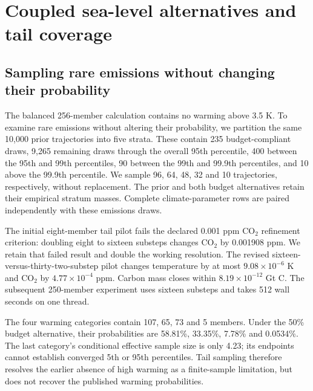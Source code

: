 \section{Coupled sea-level alternatives and tail coverage}
\subsection{Sampling rare emissions without changing their probability}
The balanced 256-member calculation contains no warming above 3.5 K. To examine
rare emissions without altering their probability, we partition the same
10,000 prior trajectories into five strata. These contain 235 budget-compliant
draws, 9,265 remaining draws through the overall 95th percentile, 400 between
the 95th and 99th percentiles, 90 between the 99th and 99.9th percentiles, and
10 above the 99.9th percentile. We sample 96, 64, 48, 32 and 10 trajectories,
respectively, without replacement. The prior and both budget alternatives
retain their empirical stratum masses. Complete climate-parameter rows are
paired independently with these emissions draws.

The initial eight-member tail pilot fails the declared 0.001 ppm CO$_2$
refinement criterion: doubling eight to sixteen substeps changes CO$_2$ by
0.001908 ppm. We retain that failed result and double the working resolution.
The revised sixteen-versus-thirty-two-substep pilot changes temperature by at
most $9.08\times10^{-6}$ K and CO$_2$ by $4.77\times10^{-4}$ ppm. Carbon mass
closes within $8.19\times10^{-12}$ Gt C. The subsequent 250-member experiment
uses sixteen substeps and takes 512 wall seconds on one thread.

The four warming categories contain 107, 65, 73 and 5 members. Under the 50\%
budget alternative, their probabilities are 58.81\%, 33.35\%, 7.78\% and
0.0534\%. The last category's conditional effective sample size is only 4.23;
its endpoints cannot establish converged 5th or 95th percentiles. Tail sampling
therefore resolves the earlier absence of high warming as a finite-sample
limitation, but does not recover the published warming probabilities.

